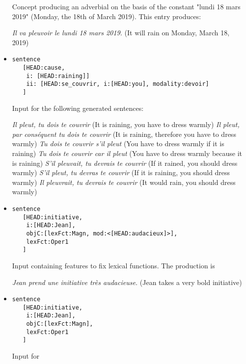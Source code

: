 \documentclass[11pt]{article}
\begin{document}
\begin{itemize}
Concept producing an adverbial on the basis of the
constant "lundi 18 mars 2019" (Monday, the 18th of March 2019). This entry produces:

\begin{exe}
\ex \textit{Il va pleuvoir le lundi 18 mars 2019.} (It will rain on Monday, March 18, 2019) 
\end{exe}

\item 
\begin{verbatim}
sentence 
   [HEAD:cause, 
    i: [HEAD:raining]]
    ii: [HEAD:se_couvrir, i:[HEAD:you], modality:devoir]
   ]
\end{verbatim}

Input for the following generated sentences:
\begin{exe}
\ex \begin{xlist} 
\ex \textit{Il pleut, tu dois te couvrir} (It is raining, you have to dress warmly)
\ex \textit{Il pleut, par conséquent tu dois te couvrir} (It is raining, therefore you have to dress warmly)
\ex \textit{Tu dois te couvrir s'il pleut} (You have to dress warmly if it is raining)
\ex \textit{Tu dois te couvrir car il pleut} (You have to dress warmly because it is raining)
\ex \textit{S'il pleuvait, tu devrais te couvrir} (If it rained, you should dress warmly)
\ex \textit{S'il pleut, tu devras te couvrir} (If it is raining, you should dress warmly)
\ex \textit{Il pleuvrait, tu devrais te couvrir} (It would rain, you should dress warmly)
\end{xlist}
\end{exe}

\item 
\begin{verbatim}
sentence 
   [HEAD:initiative, 
    i:[HEAD:Jean], 
    objC:[lexFct:Magn, mod:<[HEAD:audacieux]>], 
    lexFct:Oper1
   ]
\end{verbatim}

Input containing features to fix lexical functions. The
production is 
\begin{exe}
\ex \textit{Jean prend une initiative très audacieuse.} (Jean takes a very bold initiative)
\end{exe}

\item 
\begin{verbatim}
sentence 
   [HEAD:initiative, 
    i:[HEAD:Jean], 
    objC:[lexFct:Magn], 
    lexFct:Oper1
   ]
\end{verbatim}

Input for


\end{itemize}
\end{document}
